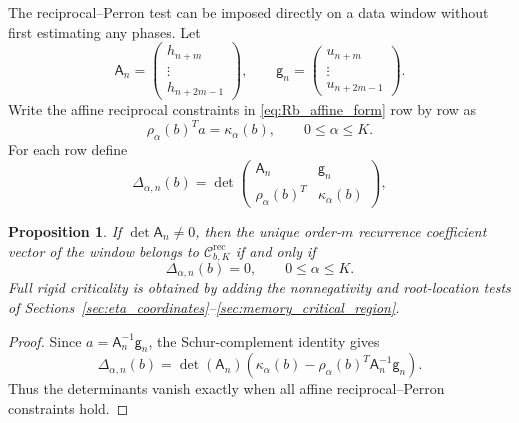 \documentclass[11pt]{amsart}
\numberwithin{equation}{section}
\theoremstyle{plain}
\newtheorem{proposition}[theorem]{Proposition}
\theoremstyle{definition}
\theoremstyle{remark}
\begin{document}
The reciprocal--Perron test can be imposed directly on a data window without first estimating any phases.  Let
\begin{equation}
\mathsf A_n
=
\begin{pmatrix}
h_{n+m}\\
\vdots\\
h_{n+2m-1}
\end{pmatrix},
\qquad
\mathsf g_n
=
\begin{pmatrix}
u_{n+m}\\
\vdots\\
u_{n+2m-1}
\end{pmatrix}.
\label{eq:data_recurrence_matrix}
\end{equation}
Write the affine reciprocal constraints in \eqref{eq:Rb_affine_form} row by row as
\begin{equation}
\rho_\alpha(b)^Ta=\kappa_\alpha(b),
\qquad
0\leq\alpha\leq K.
\label{eq:affine_constraint_rows}
\end{equation}
For each row define
\begin{equation}
\Delta_{\alpha,n}(b)
=
\det
\begin{pmatrix}
\mathsf A_n & \mathsf g_n\\
\rho_\alpha(b)^T & \kappa_\alpha(b)
\end{pmatrix},
\label{eq:frequency_free_determinant}
\end{equation}

\begin{proposition}
\label{prop:frequency_free_test}
If $\det\mathsf A_n\neq0$, then the unique order-$m$ recurrence coefficient vector of the window belongs to $\mathcal C^{\mathrm{rec}}_{b,K}$ if and only if
\begin{equation}
\Delta_{\alpha,n}(b)=0,
\qquad 0\leq\alpha\leq K.
\label{eq:all_frequency_free_determinants}
\end{equation}
Full rigid criticality is obtained by adding the nonnegativity and root-location tests of Sections~\ref{sec:eta_coordinates}--\ref{sec:memory_critical_region}.
\end{proposition}

\begin{proof}
Since $a=\mathsf A_n^{-1}\mathsf g_n$, the Schur-complement identity gives
\begin{equation}
\Delta_{\alpha,n}(b)
=
\det(\mathsf A_n)
\left(
\kappa_\alpha(b)-\rho_\alpha(b)^T\mathsf A_n^{-1}\mathsf g_n
\right).
\label{eq:schur_determinant_identity}
\end{equation}
Thus the determinants vanish exactly when all affine reciprocal--Perron constraints hold.
\end{proof}
\end{document}
